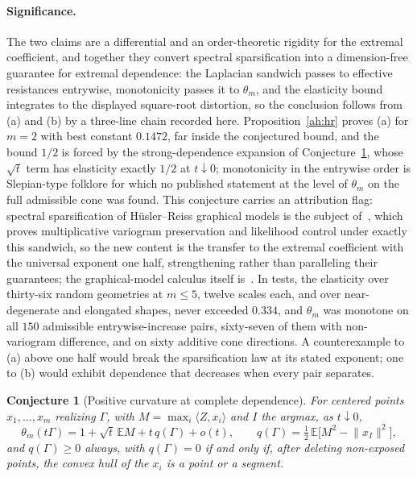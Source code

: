 \documentclass[11pt]{article}
\newtheorem{conjecture}{Conjecture}
\theoremstyle{definition}
\newcommand{\E}{\mathbb E}
\providecommand{\E}{\mathbb E}
\begin{document}
\paragraph{Significance.}
The two claims are a differential and an order-theoretic rigidity for the extremal coefficient, and together they convert spectral sparsification into a dimension-free guarantee for extremal dependence: the Laplacian sandwich passes to effective resistances entrywise, monotonicity passes it to $\theta_m$, and the elasticity bound integrates to the displayed square-root distortion, so the conclusion follows from (a) and (b) by a three-line chain recorded here.  Proposition~\ref{ah:hr} proves (a) for $m=2$ with best constant $0.1472$, far inside the conjectured bound, and the bound $1/2$ is forced by the strong-dependence expansion of Conjecture~\ref{ah4}, whose $\sqrt t$ term has elasticity exactly $1/2$ at $t\downarrow0$; monotonicity in the entrywise order is Slepian-type folklore for which no published statement at the level of $\theta_m$ on the full admissible cone was found.  This conjecture carries an attribution flag: spectral sparsification of H\"usler--Reiss graphical models is the subject of~\cite{EAR26}, which proves multiplicative variogram preservation and likelihood control under exactly this sandwich, so the new content is the transfer to the extremal coefficient with the universal exponent one half, strengthening rather than paralleling their guarantees; the graphical-model calculus itself is~\cite{EH20,HES25}.  In tests, the elasticity over thirty-six random geometries at $m\le5$, twelve scales each, and over near-degenerate and elongated shapes, never exceeded $0.334$, and $\theta_m$ was monotone on all $150$ admissible entrywise-increase pairs, sixty-seven of them with non-variogram difference, and on sixty additive cone directions.  A counterexample to (a) above one half would break the sparsification law at its stated exponent; one to (b) would exhibit dependence that decreases when every pair separates.

\begin{conjecture}[Positive curvature at complete dependence]\label{ah4}
For centered points $x_1,\ldots,x_m$ realizing $\Gamma$, with $M=\max_i\langle Z,x_i\rangle$ and $I$ the argmax, as $t\downarrow0$,
\[
\theta_m(t\Gamma)=1+\sqrt t\,\E M+t\,q(\Gamma)+o(t),\qquad q(\Gamma)=\tfrac12\,\E\bigl[M^2-\lVert x_I\rVert^2\bigr],
\]
and $q(\Gamma)\ge0$ always, with $q(\Gamma)=0$ if and only if, after deleting non-exposed points, the convex hull of the $x_i$ is a point or a segment.
\end{conjecture}
\end{document}
